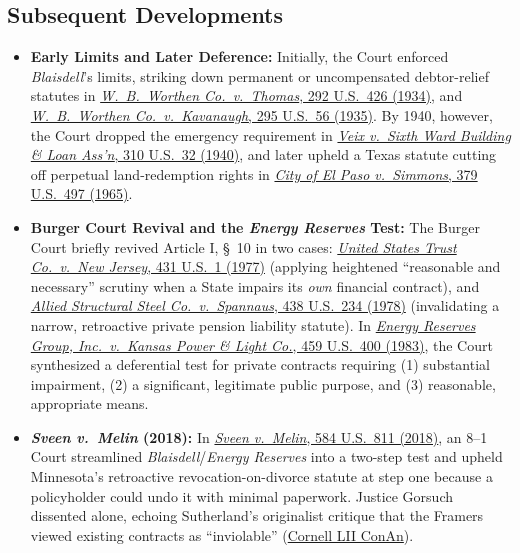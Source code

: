 \documentclass[12pt]{article}
\begin{document}
\subsection{Subsequent Developments}

\begin{itemize}

\item \textbf{Early Limits and Later Deference:} Initially, the Court enforced \emph{Blaisdell}'s limits, striking down permanent or uncompensated debtor-relief statutes in \href{https://supreme.justia.com/cases/federal/us/292/426/}{\emph{W.\ B.\ Worthen Co.\ v.\ Thomas}, 292 U.S.\ 426 (1934)}, and \href{https://supreme.justia.com/cases/federal/us/295/56/}{\emph{W.\ B.\ Worthen Co.\ v.\ Kavanaugh}, 295 U.S.\ 56 (1935)}. By 1940, however, the Court dropped the emergency requirement in \href{https://supreme.justia.com/cases/federal/us/310/32/}{\emph{Veix v.\ Sixth Ward Building \& Loan Ass'n}, 310 U.S.\ 32 (1940)}, and later upheld a Texas statute cutting off perpetual land-redemption rights in \href{https://supreme.justia.com/cases/federal/us/379/497/}{\emph{City of El Paso v.\ Simmons}, 379 U.S.\ 497 (1965)}.

\item \textbf{Burger Court Revival and the \textit{Energy Reserves} Test:} The Burger Court briefly revived Article I, \S\ 10 in two cases: \href{https://supreme.justia.com/cases/federal/us/431/1/}{\emph{United States Trust Co.\ v.\ New Jersey}, 431 U.S.\ 1 (1977)} (applying heightened ``reasonable and necessary'' scrutiny when a State impairs its \emph{own} financial contract), and \href{https://supreme.justia.com/cases/federal/us/438/234/}{\emph{Allied Structural Steel Co.\ v.\ Spannaus}, 438 U.S.\ 234 (1978)} (invalidating a narrow, retroactive private pension liability statute). In \href{https://supreme.justia.com/cases/federal/us/459/400/}{\emph{Energy Reserves Group, Inc.\ v.\ Kansas Power \& Light Co.}, 459 U.S.\ 400 (1983)}, the Court synthesized a deferential test for private contracts requiring (1) substantial impairment, (2) a significant, legitimate public purpose, and (3) reasonable, appropriate means.

\item \textbf{\textit{Sveen v.\ Melin} (2018):} In \href{https://www.law.cornell.edu/supremecourt/text/16-1432}{\emph{Sveen v.\ Melin}, 584 U.S.\ 811 (2018)}, an 8--1 Court streamlined \emph{Blaisdell}/\emph{Energy Reserves} into a two-step test and upheld Minnesota's retroactive revocation-on-divorce statute at step one because a policyholder could undo it with minimal paperwork. Justice Gorsuch dissented alone, echoing Sutherland's originalist critique that the Framers viewed existing contracts as ``inviolable'' (\href{https://www.law.cornell.edu/constitution-conan/article-1/section-10/clause-1/historical-background-on-the-contract-clause}{Cornell LII ConAn}).

\end{itemize}
\end{document}
